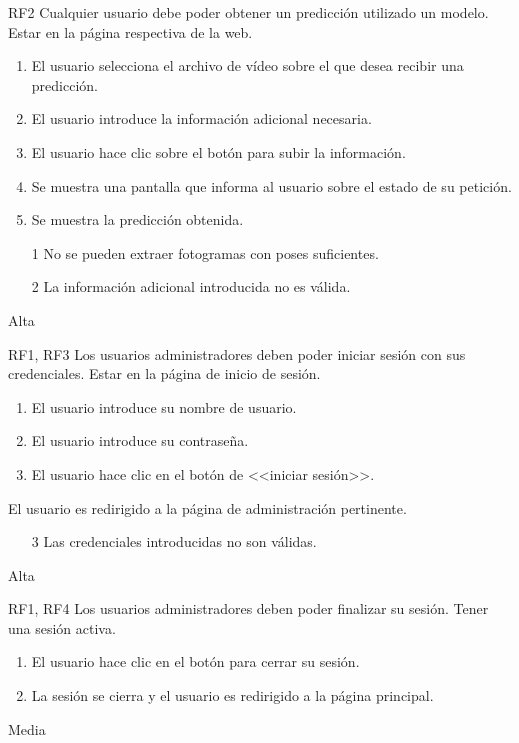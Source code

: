
{RF2}
{Cualquier usuario debe poder obtener un predicción utilizado un modelo.}
{Estar en la página respectiva de la web.}
{
    \begin{enumerate}
        \def\labelenumi{\arabic{enumi}.}
        \tightlist
        \item El usuario selecciona el archivo de vídeo sobre el que desea
              recibir una predicción.
        \item El usuario introduce la información adicional necesaria.
        \item El usuario hace clic sobre el botón para subir la información.
        \item Se muestra una pantalla que informa al usuario sobre el estado de
              su petición.
        \item Se muestra la predicción obtenida.
    \end{enumerate}
}
{}
{
    \begin{itemize}
        \item [1] No se pueden extraer fotogramas con poses suficientes.
        \item [2] La información adicional introducida no es válida.
    \end{itemize}
}
{Alta}

{RF1, RF3}
{Los usuarios administradores deben poder iniciar sesión con sus credenciales.}
{Estar en la página de inicio de sesión.}
{
    \begin{enumerate}
        \def\labelenumi{\arabic{enumi}.}
        \tightlist
        \item El usuario introduce su nombre de usuario.
        \item El usuario introduce su contraseña.
        \item El usuario hace clic en el botón de <<iniciar sesión>>.
    \end{enumerate}
}
{El usuario es redirigido a la página de administración pertinente.}
{
    \begin{itemize}
        \item [3] Las credenciales introducidas no son válidas.
    \end{itemize}
}
{Alta}

{RF1, RF4}
{Los usuarios administradores deben poder finalizar su sesión.}
{Tener una sesión activa.}
{
    \begin{enumerate}
        \def\labelenumi{\arabic{enumi}.}
        \tightlist
        \item El usuario hace clic en el botón para cerrar su sesión.
        \item La sesión se cierra y el usuario es redirigido a la página principal.
    \end{enumerate}
}
{}
{}
{Media}

